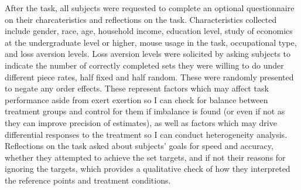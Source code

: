 \documentclass[
  12,
  letterpaper,
  DIV=11,
  numbers=noendperiod]{scrartcl}
\begin{document}
After the task, all subjects were requested to complete an optional
questionnaire on their charcateristics and reflections on the task.
Characteristics collected include gender, race, age, household income,
education level, study of economics at the undergraduate level or
higher, mouse usage in the task, occupational type, and loss aversion
levels. Loss aversion levels were solicited by asking subjects to
indicate the number of correctly completed sets they were willing to do
under different piece rates, half fixed and half random. These were
randomly presented to negate any order effects. These represent factors
which may affect task performance aside from exert exertion so I can
check for balance between treatment groups and control for them if
imbalance is found (or even if not as they can improve precision of
estimates), as well as factors which may drive differential responses to
the treatment so I can conduct heterogeneity analysis. Reflections on
the task asked about subjects' goals for speed and accuracy, whether
they attempted to achieve the set targets, and if not their reasons for
ignoring the targets, which provides a qualitative check of how they
interpreted the reference points and treatment conditions.
\end{document}

